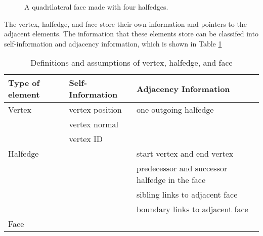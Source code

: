\documentclass[12pt]{article}
\begin{document}
\begin{figure}[h]
  \centering
  \caption{A quadrilateral face made with four halfedges.}
  \label{figure:singleFace}
\end{figure}

The vertex, halfedge, and face store their own information and pointers to the adjacent elements. The information that these elements store can be classifed into self-information and adjacency information, which is shown in Table \ref{table:vhfInfo}
\begin{table}[h]
\centering
\begin{tabular}{| l | p{} | p{}|}

\hline
Type of element & Self-Information & Adjacency Information  \\
\hline
Vertex  & vertex position & one outgoing halfedge   \\
& vertex normal & \\
& vertex ID & \\
\hline
Halfedge & & start vertex and end vertex\\
& & predecessor and successor halfedge in the face\\
& & sibling links to adjacent face\\
& & boundary links to adjacent face \\
\hline
Face    &  &\\
\hline
\end{tabular}
\caption{Definitions and assumptions of vertex, halfedge, and face} 
\label{table:vhfInfo}
\end{table}
\end{document}
